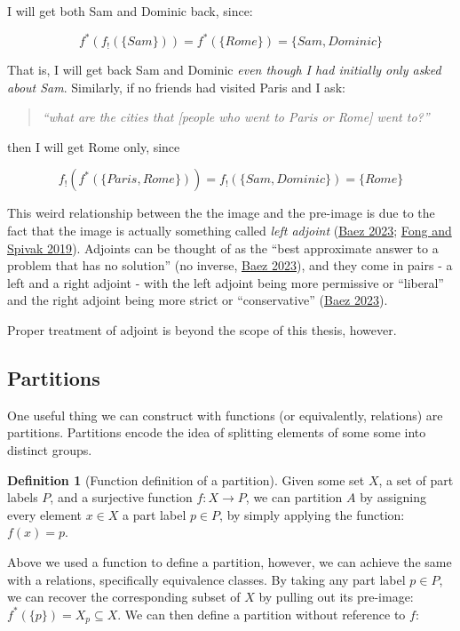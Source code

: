 \documentclass[
]{book}
\theoremstyle{definition}
\newtheorem{definition}{Definition}[chapter]
\theoremstyle{definition}
\theoremstyle{definition}
\theoremstyle{definition}
\theoremstyle{remark}
\begin{document}
I will get both Sam and Dominic back, since:

\[f^*(f_!(\{ Sam \})) = f^*(\{ Rome \}) = \{ Sam, Dominic \}\]

That is, I will get back Sam and Dominic \emph{even though I had initially only asked about Sam}. Similarly, if no friends had visited Paris and I ask:

\begin{quote}
\emph{``what are the cities that {[}people who went to Paris or Rome{]} went to?''}
\end{quote}

then I will get Rome only, since

\[f_!(f^*(\{Paris, Rome \})) = f_!(\{ Sam, Dominic \}) = \{ Rome \}\]

This weird relationship between the the image and the pre-image is due to the fact that the image is actually something called \emph{left adjoint} (\protect\hyperlink{ref-baez2023}{Baez 2023}; \protect\hyperlink{ref-fong2019}{Fong and Spivak 2019}). Adjoints can be thought of as the ``best approximate answer to a problem that has no solution'' (no inverse, \protect\hyperlink{ref-baez2023}{Baez 2023}), and they come in pairs - a left and a right adjoint - with the left adjoint being more permissive or ``liberal'' and the right adjoint being more strict or ``conservative'' (\protect\hyperlink{ref-baez2023}{Baez 2023}).

Proper treatment of adjoint is beyond the scope of this thesis, however.

\hypertarget{partitions}{%
\subsection{Partitions}\label{partitions}}

One useful thing we can construct with functions (or equivalently, relations) are partitions. Partitions encode the idea of splitting elements of some some into distinct groups.

\begin{definition}[Function definition of a partition]
Given some set \(X\), a set of part labels \(P\), and a surjective function \(f: X \to P\), we can partition \(A\) by assigning every element \(x \in X\) a part label \(p \in P\), by simply applying the function: \(f(x) = p\).
\end{definition}

Above we used a function to define a partition, however, we can achieve the same with a relations, specifically equivalence classes. By taking any part label \(p \in P\), we can recover the corresponding subset of \(X\) by pulling out its pre-image: \(f^*(\{p\}) = X_p \subseteq X\). We can then define a partition without reference to \(f\):
\end{document}
